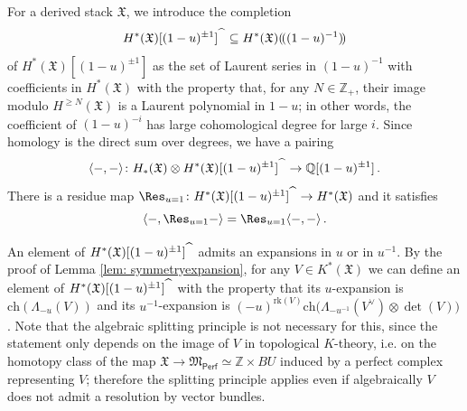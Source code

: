 \documentclass[12pt]{amsart}
\theoremstyle{definition}
\newcommand{\BQ}{{\mathbb{Q}}}
\newcommand{\BZ}{{\mathbb{Z}}}
\newcommand{\1}{\mathbf 1}
\newcommand{\FM}{{\mathfrak{M}}}
\newcommand{\FX}{{\mathfrak{X}}}
\newcommand{\lpp}{(\hspace{-0.15em}(}
\newcommand{\rpp}{)\hspace{-0.15em})}
\newcommand{\ch}{\mathrm{ch}}
\newcommand{\Perf}{\mathsf{Perf}}
\newcommand{\rk}{\mathrm{rk}}
\begin{document}
For a derived stack $\FX$, we introduce the completion 
\[H^\ast(\FX)[(1-u)^{\pm 1}]^{\widehat{\hspace{0.2cm}}} \subseteq H^\ast(\FX)\lpp (1-u)^{-1}\rpp \]
of $H^\ast(\FX)[(1-u)^{\pm 1}]$ as the set of Laurent series in $(1-u)^{-1}$ with coefficients in $H^\ast(\FX)$ with the property that, for any $N\in \BZ_{+}$, their image modulo $H^{\geq N}(\FX)$ is a Laurent polynomial in $1-u$; in other words, the coefficient of $(1-u)^{-i}$ has large cohomological degree for large $i$. Since homology is the direct sum over degrees, we have a pairing
\[\langle -, -\rangle\colon H_\ast(\FX)\otimes H^\ast(\FX)[(1-u)^{\pm 1}]^{\widehat{\hspace{0.2cm}}}\to \BQ[(1-u)^{\pm 1}]\,.\]
There is a residue map $\Res_{u=1}\colon H^\ast(\FX)[(1-u)^{\pm 1}]^{\widehat{\hspace{0.2cm}}}\to H^\ast(\FX)$ and it satisfies
\[\langle -, \Res_{u=1}-\rangle=\Res_{u=1}\langle - , -\rangle\,.\]

An element of $H^\ast(\FX)[(1-u)^{\pm 1}]^{\widehat{\hspace{0.2cm}}}$ admits an expansions in $u$ or in $u^{-1}$. By the proof of Lemma \ref{lem: symmetryexpansion}, for any $V\in K^\ast(\FX)$ we can define an element of $H^\ast(\FX)[(1-u)^{\pm 1}]^{\widehat{\hspace{0.2cm}}}$
with the property that its $u$-expansion is $\ch(\Lambda_{-u}(V))$ and its $u^{-1}$-expansion is $(-u)^{\rk(V)}\ch\big(\Lambda_{-u^{-1}}(V^\vee)\otimes \det(V)\big)$. Note that the algebraic splitting principle is not necessary for this, since the statement only depends on the image of $V$ in topological $K$-theory, i.e. on the homotopy class of the map $\FX\to \FM_{\Perf}\simeq  \BZ\times BU$ induced by a perfect complex representing $V$; therefore the splitting principle applies even if algebraically $V$ does not admit a resolution by vector bundles.
\end{document}
